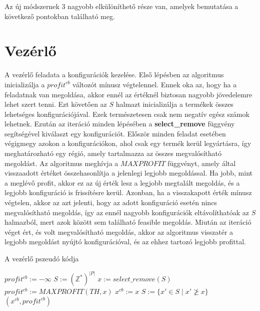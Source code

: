 Az új módszernek 3 nagyobb elkülöníthető része van, amelyek bemutatása a következő pontokban található meg.

\section{Vezérlő}
A vezérlő feladata a konfigurációk kezelése.
Első lépésben az algoritmus inicializálja a $profit^{cb}$ változót mínusz végtelennel.
Ennek oka az, hogy ha a feladatnak van megoldása, akkor ennél az értéknél biztosan nagyobb jövedelemre lehet szert tenni.
Ezt követően az $S$ halmazt inicializálja a termékek összes lehetséges konfigurációjával.
Ezek természetesen csak nem negatív egész számok lehetnek.
Ezután az iteráció minden lépésében a \textbf{select\_remove} függvény segítségével kiválaszt egy konfigurációt.
Először minden feladat esetében végigmegy azokon a konfigurációkon, ahol csak egy termék kerül legyártásra, így meghatározható egy régió, amely tartalmazza az összes megvalósítható megoldást.
Az algoritmus meghívja a $MAXPROFIT$ függvényt, amely által visszaadott értéket összehasonlítja a jelenlegi legjobb megoldással.
Ha jobb, mint a meglévő profit, akkor ez az új érték lesz a legjobb megtalált megoldás, és a legjobb konfiguráció is frissítésre kerül.
Azonban, ha a visszakapott érték mínusz végtelen, akkor az azt jelenti, hogy az adott konfiguráció esetén nincs megvalósítható megoldás, így az ennél nagyobb konfigurációk eltávolíthatóak az $S$ halmazból, mert azok között sem található feasible megoldás.
Miután az iteráció véget ért, és volt megvalósítható megoldás, akkor az algoritmus visszatér a legjobb megoldást nyújtó konfigurációval, és az ehhez tartozó legjobb profittal.

\begin{algorithm}[H]
\caption{A vezérlő pszeudó kódja}
\label{vezerlo}
\begin{algorithmic}[1]
	\State $profit^{cb}:= -\infty$
	\State $S:= (\mathbb{Z}^*)^{|P|}$
    	\State $x:= select\_remove(S)$
    		\State $profit^{cb}:=MAXPROFIT(TH,x)$
    		\State $x^{cb}:=x$    		
    		\State $S:=\{x'\in{S} \mid  x' \not\ge x\}$
    	\EndIf
    \EndWhile
    	\State \Return $(x^{cb},profit^{cb})$
    \EndIf
\EndProcedure
\end{algorithmic}
\end{algorithm}

